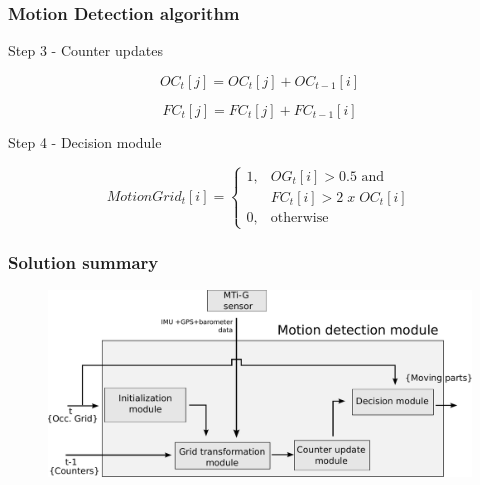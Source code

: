 \documentclass{beamer}
\begin{document}
	\begin{frame}
		\frametitle{Motion Detection algorithm}		

			\begin{block}{Step 3 - Counter updates}		  

			\begin{equation*}
			OC_t[j] = OC_t[j] + OC_{t-1}[i]
			\end{equation*}  

			\begin{equation*}
			FC_t[j] = FC_t[j] + FC_{t-1}[i]
			\end{equation*}	
				 		
			\end{block}
		
		\begin{block}{Step 4 - Decision module}	

		\begin{equation*}
			MotionGrid_t[i] = \begin{cases} 1, & \mbox{$OG_t[i] > 0.5$ and} \\ & \mbox {$FC_t[i]>2\;  x \; OC_t[i]$} \\
		                                0, & \mbox{otherwise}\end{cases}
		\end{equation*}		
				
		\end{block}		
		
	\end{frame}


	\begin{frame}
		\frametitle{Solution summary}
		\begin{figure}[h]
			\center
			\includegraphics[scale=0.40]{../img/fig:motion:framework:motionmodule}
		 \end{figure}
	\end{frame}	
\end{document}
